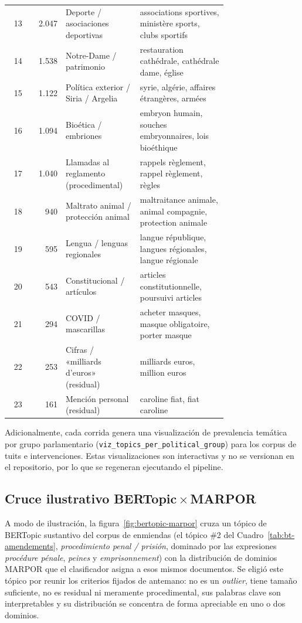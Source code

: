 {\begin{longtable}{@{}r r >{\raggedright\arraybackslash}p{0.34\linewidth} >{\raggedright\arraybackslash}p{0.40\linewidth}@{}}
13 & 2.047 & Deporte / asociaciones deportivas & associations sportives, ministère sports, clubs sportifs \\
14 & 1.538 & Notre-Dame / patrimonio & restauration cathédrale, cathédrale dame, église \\
15 & 1.122 & Política exterior / Siria / Argelia & syrie, algérie, affaires étrangères, armées \\
16 & 1.094 & Bioética / embriones & embryon humain, souches embryonnaires, lois bioéthique \\
17 & 1.040 & Llamadas al reglamento (procedimental) & rappels règlement, rappel règlement, règles \\
18 & 940 & Maltrato animal / protección animal & maltraitance animale, animal compagnie, protection animale \\
19 & 595 & Lengua / lenguas regionales & langue république, langues régionales, langue régionale \\
20 & 543 & Constitucional / artículos & articles constitutionnelle, poursuivi articles \\
21 & 294 & COVID / mascarillas & acheter masques, masque obligatoire, porter masque \\
22 & 253 & Cifras / «milliards d'euros» (residual) & milliards euros, million euros \\
23 & 161 & Mención personal (residual) & caroline fiat, fiat caroline \\
\end{longtable}
}

Adicionalmente, cada corrida genera una visualización de prevalencia temática por
grupo parlamentario (\texttt{viz\_topics\_per\_political\_group}) para los corpus
de tuits e intervenciones. Estas visualizaciones son interactivas y no se
versionan en el repositorio, por lo que se regeneran ejecutando el pipeline.

\subsection{Cruce ilustrativo BERTopic\,$\times$\,MARPOR}
\label{anexo:bertopic-marpor}

A modo de ilustración, la figura~\ref{fig:bertopic-marpor} cruza un tópico de
BERTopic sustantivo del corpus de enmiendas (el tópico \#2 del
Cuadro~\ref{tab:bt-amendements}, \emph{procedimiento penal / prisión}, dominado
por las expresiones \emph{procédure pénale}, \emph{peines} y
\emph{emprisonnement}) con la distribución de dominios MARPOR que el
clasificador asigna a esos mismos documentos. Se eligió este tópico por reunir
los criterios fijados de antemano: no es un \emph{outlier}, tiene tamaño
suficiente, no es residual ni meramente procedimental, sus palabras clave son
interpretables y su distribución se concentra de forma apreciable en uno o dos
dominios.

